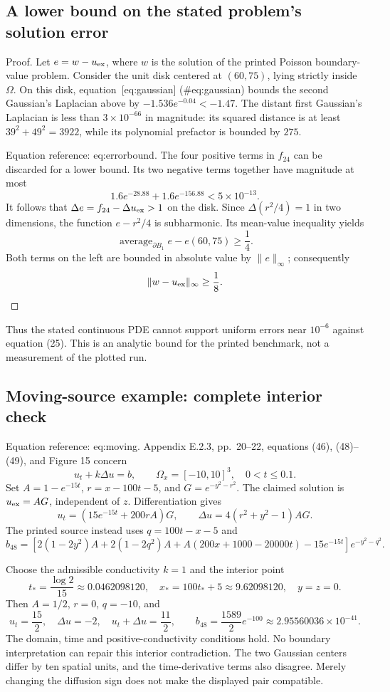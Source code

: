 \documentclass[10pt]{article}
\begin{document}
\subsection*{A lower bound on the stated problem’s solution error}
Proof. Let \(e=w-u_{\rm ex}\), where \(w\) is the solution of the printed Poisson boundary-value problem. Consider the unit disk centered at \((60,75)\), lying strictly inside \(\Omega\). On this disk, equation [eq:gaussian] (\#eq:gaussian) bounds the second Gaussian’s Laplacian above by \(-1.536e^{-0.04}<-1.47\). The distant first Gaussian’s Laplacian is less than \(3\times10^{-66}\) in magnitude: its squared distance is at least \(39^2+49^2=3922\), while its polynomial prefactor is bounded by \(275\).\par
Equation reference: eq:errorbound. The four positive terms in \(f_{24}\) can be discarded for a lower bound. Its two negative terms together have magnitude at most \[1.6e^{-28.88}+1.6e^{-156.88}<5\times10^{-13}.\] It follows that \(\Delta e=f_{24}-\Delta u_{\rm ex}>1\) on the disk. Since \(\Delta(r^2/4)=1\) in two dimensions, the function \(e-r^2/4\) is subharmonic. Its mean-value inequality yields \[\operatorname{average}_{\partial B_1}e-e(60,75)\ge\frac14.\] Both terms on the left are bounded in absolute value by \(\|e\|_\infty\); consequently \[
 \|w-u_{\rm ex}\|_\infty\ge\frac18.\] ◻\par
Thus the stated continuous PDE cannot support uniform errors near \(10^{-6}\) against equation (25). This is an analytic bound for the printed benchmark, not a measurement of the plotted run.\par
\subsection*{Moving-source example: complete interior check}
Equation reference: eq:moving. Appendix E.2.3, pp. 20–22, equations (46), (48)–(49), and Figure 15 concern \[u_t+k\Delta u=b,\qquad
 \Omega_x=[-10,10]^3,\quad 0<t\le0.1.\] Set \(A=1-e^{-15t}\), \(r=x-100t-5\), and \(G=e^{-y^2-r^2}\). The claimed solution is \(u_{\rm ex}=AG\), independent of \(z\). Differentiation gives \[
 u_t=(15e^{-15t}+200rA)G,\qquad
 \Delta u=4(r^2+y^2-1)AG.\] The printed source instead uses \(q=100t-x-5\) and \[b_{48}=\left[
 2(1-2y^2)A+2(1-2q^2)A
 +A(200x+1000-20000t)-15e^{-15t}
 \right]e^{-y^2-q^2}.\]\par
Choose the admissible conductivity \(k=1\) and the interior point \[t_*=\frac{\log2}{15}\approx0.0462098120,\quad
 x_*=100t_*+5\approx9.62098120,\quad y=z=0.\] Then \(A=1/2\), \(r=0\), \(q=-10\), and \[u_t=\frac{15}{2},\quad \Delta u=-2,\quad
 u_t+\Delta u=\frac{11}{2},
 \qquad b_{48}=\frac{1589}{2}e^{-100}
 \approx2.95560036\times10^{-41}.\] The domain, time and positive-conductivity conditions hold. No boundary interpretation can repair this interior contradiction. The two Gaussian centers differ by ten spatial units, and the time-derivative terms also disagree. Merely changing the diffusion sign does not make the displayed pair compatible.\par
\end{document}
